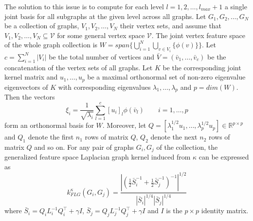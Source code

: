 \documentclass[twoside,11pt]{article}
\begin{document}
The solution to this issue is to compute for each level $l=1,2,\ldots,l_{max}+1$ a single joint basis for all subgraphs at the given level across all graphs.
Let $G_1, G_2, \ldots, G_N$ be a collection of graphs, $V_1, V_2, \ldots, V_N$ their vertex sets, and assume that $V_1, V_2, \ldots, V_N \subseteq \mathcal{V}$ for some general vertex space $\mathcal{V}$.
The joint vertex feature space of the whole graph collection is $W = span \big\{ \bigcup_{i=1}^N \bigcup_{v \in V_i} \{ \phi(v) \} \big\}$.
Let $c = \sum_{i=1}^N |V_i|$ be the total number of vertices and $\bar{V} = (\bar{v}_1, \ldots, \bar{v}_c)$ be the concatenation of the vertex sets of all graphs.
Let $K$ be the corresponding joint kernel matrix and $u_1, \ldots, u_p$ be a maximal orthonormal set of non-zero eigenvalue eigenvectors of $K$ with corresponding eigenvalues $\lambda_1,\ldots,\lambda_p$ and $p=dim(W)$.
Then the vectors
\begin{equation}
    \xi_i = \frac{1}{\sqrt{\lambda_i}} \sum_{l=1}^c [u_i]_l \phi(\bar{v}_l) \qquad i=1,\ldots,p
\end{equation}
form an orthonormal basis for $W$.
Moreover, let $Q = [ \lambda_1^{1/2} u_1, \ldots, \lambda_p^{1/2} u_p ] \in \mathbb{R}^{p \times p}$ and $Q_1$ denote the first $n_1$ rows of matrix $Q$, $Q_2$ denote the next $n_2 $ rows of matrix $Q$ and so on.
For any pair of graphs $G_i, G_j$ of the collection, the generalized feature space Laplacian graph kernel induced from $\kappa$ can be expressed as
\begin{equation}
    k_{FLG}^\kappa(G_i, G_j) = \frac{| (\frac{1}{2} \bar{S}_i^{-1} + \frac{1}{2} \bar{S}_j^{-1} )^{-1} |^{1/2}}{|\bar{S}_i|^{1/4} |\bar{S}_j|^{1/4}} 
\end{equation}
where $\bar{S}_i = Q_i L_i^{-1} Q_i^\top + \gamma I$, $\bar{S}_j = Q_j L_j^{-1} Q_j^\top + \gamma I$ and $I$ is the $p \times p$ identity matrix.
\end{document}
